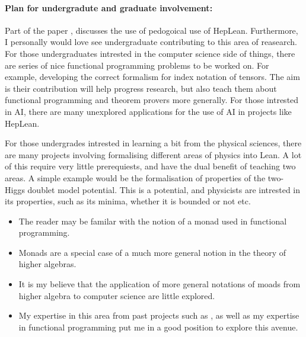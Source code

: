 \documentclass[14pt,letter]{article}
\newcounter{customtitle}
\begin{document}
\paragraph{Plan for undergradute and graduate involvement:} 
Part of the paper , discusses the use of pedogoical use 
of HepLean.   
Furthermore, I personally would love see undergraduate contributing to 
this area of reasearch. For those undergraduates intrested in the 
computer science side of things, there are series of nice 
functional programming problems to be worked on. For example, 
developing the correct formalism for index notation of tensors. 
The aim is their contribution will help progress research, but also 
teach them about functional programming and theorem provers more generally. 
For those intrested in AI, there are many unexplored applications 
for the use of AI in projects like HepLean. 

For those undergrades intrested in learning a bit from the physical sciences, 
there are many projects involving formalising different areas of 
physics into Lean. A lot of this require very little prerequiests, and have
the dual benefit of teaching two areas. A simple example would 
be the formalisation of properties of the two-Higgs doublet model potential. 
This is a potential, and physicists are intrested in its properties, 
such as its minima, whether it is bounded or not etc.



\begin{itemize}
\item The reader may be familar with the notion of a monad used in functional programming.
\item Monads are a special case of a much more general notion in the theory of higher algebras. 
\item It is my believe that the application of more general notations of moads from higher algebra to computer science 
are little explored. 
\item My expertise in this area from past projects such as , as well as my expertise in functional programming
 put me in a good position to explore this avenue.
\end{itemize}
\end{document}
